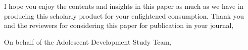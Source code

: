 \documentclass{letter}
\begin{document}
\begin{letter}{}
I hope you enjoy the contents and insights in this paper as much as we have in producing this scholarly product for your enlightened consumption. Thank you and the reviewers for considering this paper for publication in your journal,

\closing{On behalf of the Adolescent Development Study Team,}

\end{letter}
\end{document}
